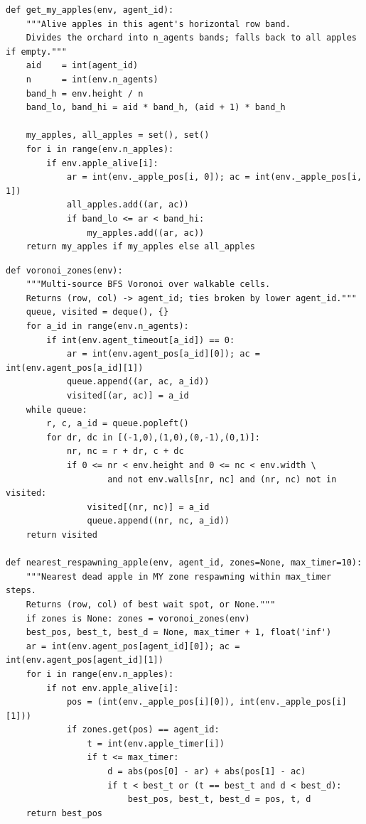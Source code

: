 \documentclass{article}
\begin{document}
\begin{lstlisting}[style=pythonpolicy, caption={Cleanup, $\Phi_{\min}$ -- band-based apple zoning helper added by the researcher in exp5. This is the primitive that lets the policy in Listing~\ref{lst:min-gemini} keep collectors within their own row band, preventing all 7 gatherers from racing to the same apple.}, label={lst:helper-zone}]
def get_my_apples(env, agent_id):
    """Alive apples in this agent's horizontal row band.
    Divides the orchard into n_agents bands; falls back to all apples if empty."""
    aid    = int(agent_id)
    n      = int(env.n_agents)
    band_h = env.height / n
    band_lo, band_hi = aid * band_h, (aid + 1) * band_h

    my_apples, all_apples = set(), set()
    for i in range(env.n_apples):
        if env.apple_alive[i]:
            ar = int(env._apple_pos[i, 0]); ac = int(env._apple_pos[i, 1])
            all_apples.add((ar, ac))
            if band_lo <= ar < band_hi:
                my_apples.add((ar, ac))
    return my_apples if my_apples else all_apples
\end{lstlisting}

\begin{lstlisting}[style=pythonpolicy, caption={Gathering -- BFS-Voronoi territory + respawn-aware waiting helpers added by the researcher in gather-exp3. These are the primitives that Listing~\ref{lst:gather-gemini} composes into a one-line policy: ``go to my\_zone\_apples, otherwise nearest\_respawning\_apple.''}, label={lst:helper-vor}]
def voronoi_zones(env):
    """Multi-source BFS Voronoi over walkable cells.
    Returns (row, col) -> agent_id; ties broken by lower agent_id."""
    queue, visited = deque(), {}
    for a_id in range(env.n_agents):
        if int(env.agent_timeout[a_id]) == 0:
            ar = int(env.agent_pos[a_id][0]); ac = int(env.agent_pos[a_id][1])
            queue.append((ar, ac, a_id))
            visited[(ar, ac)] = a_id
    while queue:
        r, c, a_id = queue.popleft()
        for dr, dc in [(-1,0),(1,0),(0,-1),(0,1)]:
            nr, nc = r + dr, c + dc
            if 0 <= nr < env.height and 0 <= nc < env.width \
                    and not env.walls[nr, nc] and (nr, nc) not in visited:
                visited[(nr, nc)] = a_id
                queue.append((nr, nc, a_id))
    return visited

def nearest_respawning_apple(env, agent_id, zones=None, max_timer=10):
    """Nearest dead apple in MY zone respawning within max_timer steps.
    Returns (row, col) of best wait spot, or None."""
    if zones is None: zones = voronoi_zones(env)
    best_pos, best_t, best_d = None, max_timer + 1, float('inf')
    ar = int(env.agent_pos[agent_id][0]); ac = int(env.agent_pos[agent_id][1])
    for i in range(env.n_apples):
        if not env.apple_alive[i]:
            pos = (int(env._apple_pos[i][0]), int(env._apple_pos[i][1]))
            if zones.get(pos) == agent_id:
                t = int(env.apple_timer[i])
                if t <= max_timer:
                    d = abs(pos[0] - ar) + abs(pos[1] - ac)
                    if t < best_t or (t == best_t and d < best_d):
                        best_pos, best_t, best_d = pos, t, d
    return best_pos
\end{lstlisting}
\end{document}
